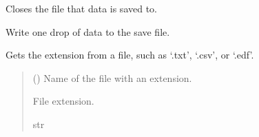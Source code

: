 \documentclass[letterpaper,10pt,english]{sphinxmanual}
\begin{document}
\begin{fulllineitems}
\begin{fulllineitems}
\label{\detokenize{PodApi.Stream.Drain:PodApi.Stream.Drain.ToFile.DrainToFile.CloseFile}}
\pysigstartsignatures
{}
\pysigstopsignatures
\sphinxAtStartPar
Closes the file that data is saved to.

\end{fulllineitems}


\begin{fulllineitems}
\label{\detokenize{PodApi.Stream.Drain:PodApi.Stream.Drain.ToFile.DrainToFile.DrainDropToFile}}
\pysigstartsignatures
{}
\pysigstopsignatures
\sphinxAtStartPar
Write one drop of data to the save file.

\end{fulllineitems}


\begin{fulllineitems}
\label{\detokenize{PodApi.Stream.Drain:PodApi.Stream.Drain.ToFile.DrainToFile.GetExtension}}
\pysigstartsignatures
{}
\pysigstopsignatures
\sphinxAtStartPar
Gets the extension from a file, such as ‘.txt’, ‘.csv’, or ‘.edf’.
\begin{quote}\begin{description}
\sphinxAtStartPar
{} () \textendash{} Name of the file with an extension.

\sphinxAtStartPar
File extension.

\sphinxAtStartPar
str

\end{description}\end{quote}

\end{fulllineitems}


\end{fulllineitems}
\end{document}
